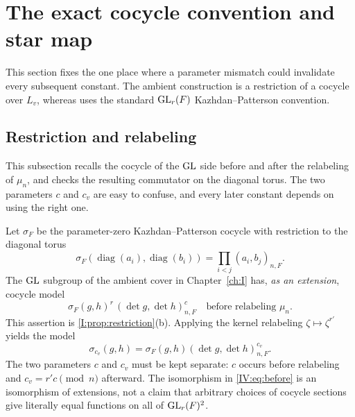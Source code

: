 \section{The exact cocycle convention and star map}\label{IV:sec:cocycle}
This section fixes the one place where a parameter mismatch could
invalidate every subsequent constant.  The ambient construction is
a restriction of a cocycle over $L_v$, whereas \cite{FK86} uses the standard
$\operatorname{GL}_r(F)$ Kazhdan--Patterson convention.

\subsection{Restriction and relabeling}\label{IV:subsec:restriction}
This subsection recalls the cocycle of the $\operatorname{GL}$ side before and after the relabeling of $\mu_n$, and checks the resulting commutator on the diagonal torus. The two parameters $c$ and $c_v$ are easy to confuse, and every later constant depends on using the right one.

Let $\sigma_F$ be the parameter-zero Kazhdan--Patterson cocycle with
restriction to the diagonal torus
\begin{equation}\label{IV:eq:parameterzero}
\sigma_F(\operatorname{diag}(a_i),\operatorname{diag}(b_i))
=\prod_{i<j}(a_i,b_j)_{n,F}.
\end{equation}
The $\operatorname{GL}$ subgroup of the ambient cover in Chapter~\ref{ch:I} has, \emph{as an
extension}, cocycle model
\begin{equation}\label{IV:eq:before}
  \sigma_F(g,h)^r\,(\det g,\det h)_{n,F}^{c}
  \quad\text{before relabeling }\mu_n.
\end{equation}
This assertion is \cref{I:prop:restriction}(b).  Applying the
kernel relabeling $\zeta\mapsto\zeta^{r'}$ yields the model
\begin{equation}\label{IV:eq:after}
 \sigma_{c_v}(g,h)=\sigma_F(g,h)
 (\det g,\det h)_{n,F}^{c_v}.
\end{equation}
The two parameters $c$ and $c_v$ must be kept separate: $c$
occurs before relabeling and $c_v=r'c\pmod n$ afterward.
The isomorphism in \eqref{IV:eq:before} is an isomorphism of extensions,
not a claim that arbitrary choices of cocycle sections give
literally equal functions on all of $\operatorname{GL}_r(F)^2$.

